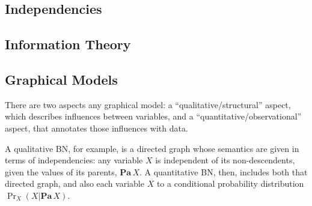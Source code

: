
\subsection{Independencies}

\subsection{Information Theory}

\subsection{Graphical Models}

There are two aspects any graphical model: 
a ``qualitative/structural'' aspect, which describes influences between variables, and
a ``quantitative/observational'' aspect, 
    that annotates those influences with data.

A qualitative BN, for example, is a directed graph whose semantics are given in terms of independencies: any variable $X$ is independent of its non-descendents, given the values of its parents, $\mathbf{Pa}\, X$.  
A quantitative BN, then, includes both that directed graph, and also each variable $X$ to a conditional probability distribution $\Pr_X(X|\mathbf{Pa}\, X)$.
